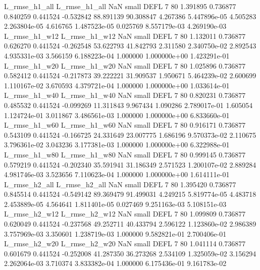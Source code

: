  L_rmse_h1_all  L_rmse_h1_all                   NaN      small     DEFL                 7 80 1.391895       0.736877 0.840259       0.441524   -0.532842     88.891139     90.308847     4.267386   5.447896e-05  4.505283 2.263804e-05     4.616765   1.487523e-05            0.025769    8.557179e-03        4.269190e-03
 L_rmse_h1_w12  L_rmse_h1_w12                   NaN      small     DEFL                 7 80 1.132011       0.736877 0.626270       0.441524   -0.262548     53.622793     41.842793     2.311580   2.340750e-02  2.892543 4.935331e-03     3.566159   6.188223e-04            1.000000    1.000000e+00        1.423291e-01
 L_rmse_h1_w20  L_rmse_h1_w20                   NaN      small     DEFL                 7 80 1.025896       0.736877 0.582412       0.441524   -0.217873     39.222221     31.909537     1.950671   5.464239e-02  2.600699 1.110167e-02     3.670593   4.379721e-04            1.000000    1.000000e+00        1.033614e-01
 L_rmse_h1_w40  L_rmse_h1_w40                   NaN      small     DEFL                 7 80 0.820231       0.736877 0.485532       0.441524   -0.099269     11.311843      9.967434     1.090286   2.789017e-01  1.605054 1.124724e-01     3.011867   3.486561e-03            1.000000    1.000000e+00        6.833660e-01
 L_rmse_h1_w60  L_rmse_h1_w60                   NaN      small     DEFL                 7 80 0.916171       0.736877 0.543109       0.441524   -0.166725     24.331649     23.007775     1.686196   9.570373e-02  2.110675 3.796361e-02     3.043236   3.177381e-03            1.000000    1.000000e+00        6.322988e-01
 L_rmse_h1_w80  L_rmse_h1_w80                   NaN      small     DEFL                 7 80 0.999145       0.736877 0.579219       0.441524   -0.202340     35.591941     31.186349     2.571523   1.200107e-02  2.889284 4.981746e-03     3.523656   7.110623e-04            1.000000    1.000000e+00        1.614111e-01
 L_rmse_h2_all  L_rmse_h2_all                   NaN      small     DEFL                 7 80 1.395420       0.736877 0.845514       0.441524   -0.549142     89.369479     91.499031     4.249215   5.819774e-05  4.483718 2.453889e-05     4.564641   1.811401e-05            0.027469    9.251163e-03        5.108151e-03
 L_rmse_h2_w12  L_rmse_h2_w12                   NaN      small     DEFL                 7 80 1.099809       0.736877 0.620049       0.441524   -0.237568     49.252711     40.433794     2.596122   1.123860e-02  2.986389 3.757969e-03     3.350601   1.238719e-03            1.000000    9.582821e-01        2.700406e-01
 L_rmse_h2_w20  L_rmse_h2_w20                   NaN      small     DEFL                 7 80 1.041114       0.736877 0.601679       0.441524   -0.252008     41.287350     36.273268     2.534109   1.325059e-02  3.156294 2.262064e-03     3.710374   3.833382e-04            1.000000    6.175436e-01        9.161783e-02
